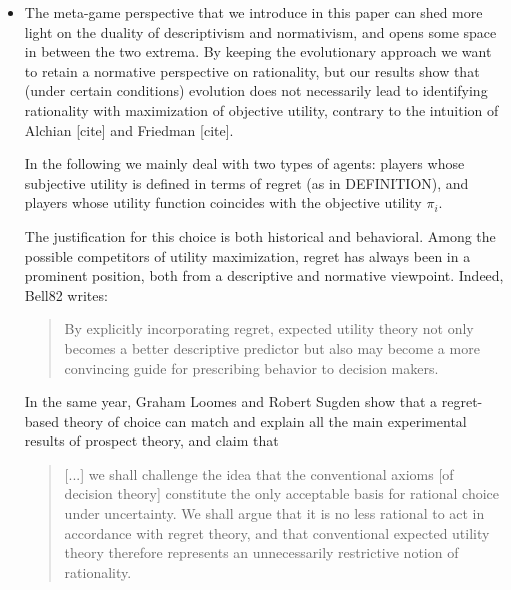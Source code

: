 \documentclass[fleqn,reqno,11pt]{article}
\begin{document}
\begin{itemize}
\item The meta-game perspective that we introduce in this paper can shed more light on the duality of descriptivism and normativism, and opens
some space in between the two extrema. 
By keeping the evolutionary approach we want to retain a
normative perspective on rationality, but our results show that (under certain conditions)
evolution does not necessarily lead to identifying rationality with maximization of objective
utility, contrary to the intuition of Alchian [cite] and Friedman [cite].

In the following we mainly deal with two types of agents: players whose subjective utility is defined
in terms of regret (as in DEFINITION), and players whose utility
function coincides with the objective utility $\pi_i$. 

The justification for this choice is both historical and behavioral. Among
the possible competitors of utility maximization, regret has always been in a prominent
position, both from a descriptive and normative viewpoint. Indeed, Bell82 writes:
\begin{quote}
  By explicitly incorporating regret, expected utility theory not only becomes a better
  descriptive predictor but also may become a more convincing guide for prescribing behavior to
  decision makers.
\end{quote}
In the same year, Graham Loomes and Robert Sugden \citet{LoomesSugden1982:Regret-Theory:-} show that a regret-based theory of choice can match
and explain all the main experimental results of prospect theory, and claim that
\begin{quote} [...] we shall challenge the idea that the conventional axioms [of decision
  theory] constitute the only acceptable basis for rational choice under uncertainty. We shall
  argue that it is no less rational to act in accordance with regret theory, and that
  conventional expected utility theory therefore represents an unnecessarily restrictive notion
  of rationality. \hfill \citep{LoomesSugden1982:Regret-Theory:-}
\end{quote}
\end{itemize}
\end{document}
